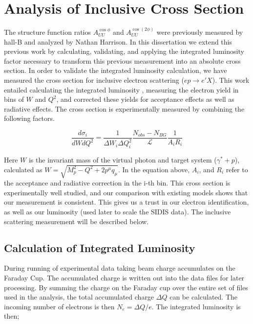 \section{Analysis of Inclusive Cross Section}

The structure function ratios $A_{UU}^{\cos\phi}$ and $A_{UU}^{\cos(2\phi)}$ were previously measured by hall-B and analyzed by Nathan Harrison.  In this dissertation we extend this previous work by calculating, validating, and applying the integrated luminosity factor necessary to transform this previous measurement into an absolute cross section.  In order to validate the integrated luminosity calculation, we have measured the cross section for inclusive electron scattering ($ep \rightarrow e'X$).  This work entailed calculating the integrated luminosity \cite{fcup-note}, measuring the electron yield in bins of $W$ and $Q^2$, and corrected these yields for acceptance effects as well as radiative effects.  The cross section is experimentally measured by combining the following factors. 

\begin{equation}
  \frac{d\sigma_i}{dW dQ^2} = \frac{1}{\Delta W_i \Delta Q^2_i} \frac{N_{obs} - N_{BG}}{\mathcal{L}} \frac{1}{A_i R_i}
\end{equation}

Here $W$ is the invariant mass of the virtual photon and target system ($\gamma^* + p$), calculated as $W = \sqrt{M_{p}^{2} - Q^2 + 2{p^\mu} q_{\mu}}$.  In the equation above, $A_i$, and $R_i$ refer to the acceptance and radiative correction in the i-th bin.  This cross section is experimentally well studied, and our comparison with existing models shows that our measurement is consistent.  This gives us a trust in our electron identification, as well as our luminosity (used later to scale the SIDIS data).  The inclusive scattering measurement will be described below.

\subsection{Calculation of Integrated Luminosity}
During running of experimental data taking beam charge accumulates on the Faraday Cup.  The accumulated charge is written out into the data files for later processing.  By summing the charge on the Faraday cup over the entire set of files used in the analysis, the total accumulated charge $\Delta Q$ can be calculated.  The incoming number of electrons is then $N_e = \Delta Q/e $.  The integrated luminosity is then; 


